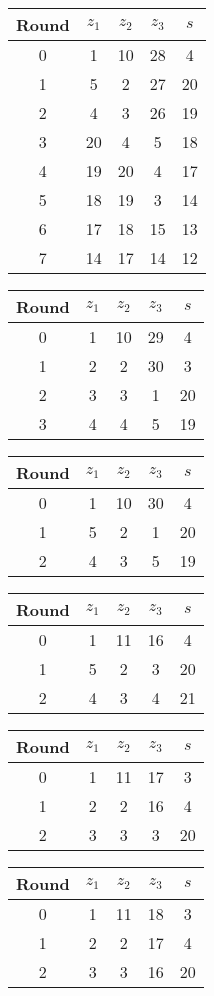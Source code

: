 \begin{tabular}{c | c | c | c | c }
Round & $z_1$ & $z_2$ & $z_3$ & $s$ \\
\hline
0 & 1 & 10 & 28 & 4 \\
1 & 5 & 2 & 27 & 20 \\
2 & 4 & 3 & 26 & 19 \\
3 & 20 & 4 & 5 & 18 \\
4 & 19 & 20 & 4 & 17 \\
5 & 18 & 19 & 3 & 14 \\
6 & 17 & 18 & 15 & 13 \\
7 & 14 & 17 & 14 & 12
\end{tabular}

\begin{tabular}{c | c | c | c | c }
Round & $z_1$ & $z_2$ & $z_3$ & $s$ \\
\hline
0 & 1 & 10 & 29 & 4 \\
1 & 2 & 2 & 30 & 3 \\
2 & 3 & 3 & 1 & 20 \\
3 & 4 & 4 & 5 & 19
\end{tabular}

\begin{tabular}{c | c | c | c | c }
Round & $z_1$ & $z_2$ & $z_3$ & $s$ \\
\hline
0 & 1 & 10 & 30 & 4 \\
1 & 5 & 2 & 1 & 20 \\
2 & 4 & 3 & 5 & 19
\end{tabular}

\begin{tabular}{c | c | c | c | c }
Round & $z_1$ & $z_2$ & $z_3$ & $s$ \\
\hline
0 & 1 & 11 & 16 & 4 \\
1 & 5 & 2 & 3 & 20 \\
2 & 4 & 3 & 4 & 21
\end{tabular}

\begin{tabular}{c | c | c | c | c }
Round & $z_1$ & $z_2$ & $z_3$ & $s$ \\
\hline
0 & 1 & 11 & 17 & 3 \\
1 & 2 & 2 & 16 & 4 \\
2 & 3 & 3 & 3 & 20
\end{tabular}

\begin{tabular}{c | c | c | c | c }
Round & $z_1$ & $z_2$ & $z_3$ & $s$ \\
\hline
0 & 1 & 11 & 18 & 3 \\
1 & 2 & 2 & 17 & 4 \\
2 & 3 & 3 & 16 & 20
\end{tabular}

